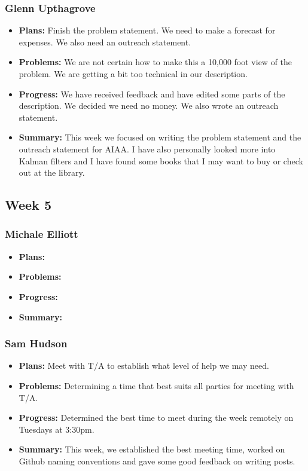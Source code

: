 \documentclass[onecolumn, draftclsnofoot,10pt, compsoc]{IEEEtran}
\begin{document}
\subsubsection{Glenn Upthagrove}
\begin {itemize}
 \item \textbf{Plans: }Finish the problem statement. We need to make a forecast for expenses. We also need an outreach statement. 
 \item \textbf{Problems: }We are not certain how to make this a 10,000 foot view of the problem. We are getting a bit too technical in our description. 
 \item \textbf{Progress: }We have received feedback and have edited some parts of the description. We decided we need no money. We also wrote an outreach statement. 
 \item \textbf{Summary: }This week we focused on writing the problem statement and the outreach statement for AIAA. I have also personally looked more into Kalman filters and I have found some books that I may want to buy or check out at the library.  
\end {itemize}
\subsection {Week 5}
\subsubsection{Michale Elliott}
\begin {itemize}
 \item \textbf{Plans: }
 \item \textbf{Problems: }
 \item \textbf{Progress: }
 \item \textbf{Summary: }
\end {itemize}
\subsubsection{Sam Hudson}
\begin {itemize}
\item \textbf{Plans: }Meet with T/A to establish what level of help we may need.
\item \textbf{Problems: }Determining a time that best suits all parties for meeting with T/A.
\item \textbf{Progress: }Determined the best time to meet during the week remotely on Tuesdays at 3:30pm.
\item \textbf{Summary: }This week, we established the best meeting time, worked on Github naming conventions and gave some good feedback on writing posts.
\end {itemize}
\end{document}
